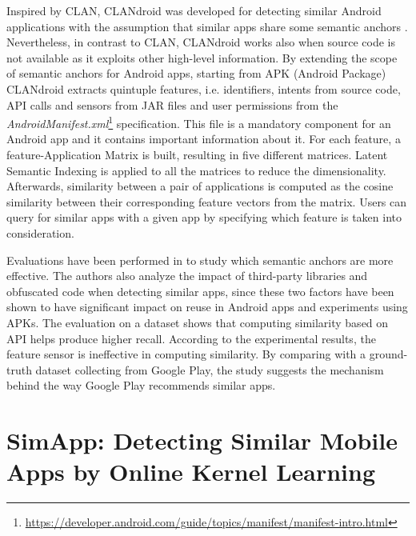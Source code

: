 Inspired by CLAN, CLANdroid was developed for detecting similar Android applications with the assumption that similar apps share some semantic anchors \cite{10.1109ICPC.2016.7503721}. Nevertheless, in contrast to CLAN, CLANdroid works also when source code is not available as it exploits other high-level information. By extending the scope of semantic anchors for Android apps, starting from APK (Android Package) CLANdroid extracts quintuple features, i.e. identifiers, intents from source code, API calls and sensors from JAR files and user permissions from the \textit{AndroidManifest.xml}\footnote{\url{https://developer.android.com/guide/topics/manifest/manifest-intro.html}} specification. This file is a mandatory component for an Android app and it contains important information about it. For each feature, a feature-Application Matrix is built, resulting in five different matrices. Latent Semantic Indexing is applied to all the matrices to reduce the dimensionality. Afterwards, similarity between a pair of applications is computed as the cosine similarity between their corresponding feature vectors from the matrix. Users can query for similar apps with a given app by specifying which feature is taken into consideration. 

Evaluations have been performed in \cite{10.1109ICPC.2016.7503721} to study which semantic anchors are more effective. The authors also analyze the impact of third-party libraries and obfuscated code when detecting similar apps, since these two factors have been shown to have significant impact on reuse in Android apps and experiments using APKs. The evaluation on a dataset shows that computing similarity based on API helps produce higher recall. According to the experimental results, the feature sensor is ineffective in computing similarity. By comparing with a ground-truth dataset collecting from Google Play, the study suggests the mechanism behind the way Google Play recommends similar apps. %


\vspace{-.2cm}

\section{SimApp: Detecting Similar Mobile Apps by Online Kernel Learning} \label{sec:SimApp}

